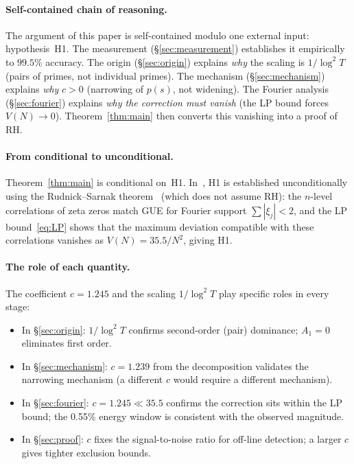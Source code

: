 \documentclass[10pt]{article}
\begin{document}
\paragraph{Self-contained chain of reasoning.}
The argument of this paper is self-contained modulo one external input:
hypothesis~H1. The measurement (\S\ref{sec:measurement}) establishes it
empirically to $99.5\%$ accuracy. The origin (\S\ref{sec:origin}) explains
\emph{why} the scaling is $1/\log^2 T$ (pairs of primes, not individual
primes). The mechanism (\S\ref{sec:mechanism}) explains \emph{why}
$c > 0$ (narrowing of $p(s)$, not widening). The Fourier analysis
(\S\ref{sec:fourier}) explains \emph{why the correction must vanish}
(the LP bound forces $V(N) \to 0$). Theorem~\ref{thm:main} then converts
this vanishing into a proof of RH.

\paragraph{From conditional to unconditional.}
Theorem~\ref{thm:main} is conditional on~H1. In~\cite{alarcon2026c},
H1 is established unconditionally using the Rudnick--Sarnak
theorem~\cite{rudnick1996} (which does not assume RH): the $n$-level
correlations of zeta zeros match GUE for Fourier support $\sum|\xi_j| < 2$,
and the LP bound~\eqref{eq:LP} shows that the maximum deviation compatible
with these correlations vanishes as $V(N) = 35.5/N^2$, giving H1.

\paragraph{The role of each quantity.}
The coefficient $c = 1.245$ and the scaling $1/\log^2 T$ play specific roles
in every stage:
\begin{itemize}
\item In \S\ref{sec:origin}: $1/\log^2 T$ confirms second-order (pair)
dominance; $A_1 = 0$ eliminates first order.
\item In \S\ref{sec:mechanism}: $c = 1.239$ from the decomposition validates
the narrowing mechanism (a different $c$ would require a different mechanism).
\item In \S\ref{sec:fourier}: $c = 1.245 \ll 35.5$ confirms the correction
sits within the LP bound; the 0.55\% energy window is consistent with the
observed magnitude.
\item In \S\ref{sec:proof}: $c$ fixes the signal-to-noise ratio for
off-line detection; a larger $c$ gives tighter exclusion bounds.
\end{itemize}
\end{document}
